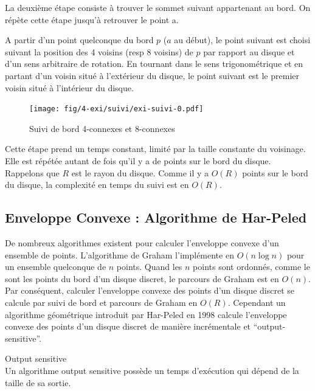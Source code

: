 La deuxième étape consiste à trouver le sommet suivant appartenant au bord. On répète cette étape jusqu'à retrouver le point a.

A partir d'un point quelconque du bord $p$ ($a$ au début), le point suivant est choisi suivant la position des 4 voisins (resp 8 voisins) de $p$ par rapport au disque et d'un sens arbitraire de rotation. En tournant dans le sens trigonométrique et en partant d'un voisin situé à l'extérieur du disque, le point suivant est le premier voisin situé à l'intérieur du disque. 

\begin{figure}[H]
  \centering
  \texttt{[image: fig/4-exi/suivi/exi-suivi-0.pdf]}
  \caption{Suivi de bord 4-connexes et 8-connexes}
\end{figure}
  
Cette étape prend un temps constant, limité par la taille constante du voisinage. Elle est répétée autant de fois qu'il y a de points sur le bord du disque. Rappelons que $R$ est le rayon du disque. Comme il y a $O(R)$ points sur le bord du disque, la complexité en temps du suivi est en $O(R)$. 

\subsection{Enveloppe Convexe : Algorithme de Har-Peled}

De nombreux algorithmes existent pour calculer l'enveloppe convexe d'un ensemble de points. L'algorithme de Graham l'implémente en $O(n \log n)$ pour un ensemble quelconque de $n$ points. Quand les $n$ points sont ordonnés, comme le sont les points du bord d'un disque discret, le parcours de Graham est en $O(n)$. Par conséquent, calculer l'enveloppe convexe des points d'un disque discret se calcule par suivi de bord et parcours de Graham en $O(R)$. Cependant un algorithme géométrique introduit par Har-Peled en 1998 calcule l'enveloppe convexe des points d'un disque discret de manière incrémentale et ``output-sensitive''.

\begin{Definition}{Output sensitive}\\
\label{def:os}
      Un algorithme output sensitive possède un temps d’exécution qui dépend de la taille de sa sortie.
\end{Definition}

